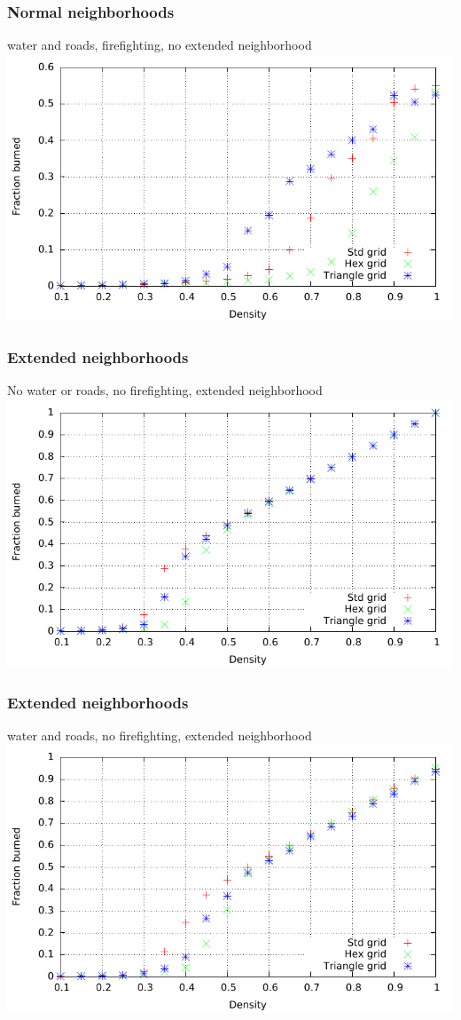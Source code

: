 \documentclass{beamer}
\begin{document}
\begin{frame}
\frametitle{Normal neighborhoods}
water and roads, firefighting, no extended neighborhood
\centering
\includegraphics[width=\textwidth]{imgs/plot/ex5/fracburned.pdf}
\end{frame}

\begin{frame}
\frametitle{Extended neighborhoods}
No water or roads, no firefighting, extended neighborhood
\centering
\includegraphics[width=\textwidth]{imgs/plot/ex2/fracburned.pdf}
\end{frame}

\begin{frame}
\frametitle{Extended neighborhoods}
water and roads, no firefighting, extended neighborhood
\centering
\includegraphics[width=\textwidth]{imgs/plot/ex4/fracburned.pdf}
\end{frame}
\end{document}
